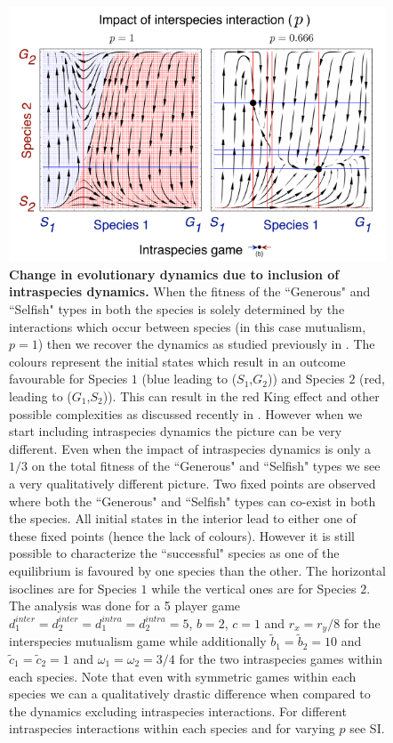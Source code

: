 \documentclass{pnastwo}
\begin{document}
\begin{article}
\begin{figure}[h]
\begin{center}
\includegraphics[width=2\columnwidth]{../Figures/mainexample2.pdf}
\caption{
\textbf{Change in evolutionary dynamics due to inclusion of intraspecies dynamics.} When the fitness of the ``Generous" and ``Selfish" types in both the species is solely determined by the interactions which occur between species (in this case mutualism, $p=1$) then we recover the dynamics as studied previously in \cite{gokhale:PRSB:2012}. The colours represent the initial states which result in an outcome favourable for Species $1$ (blue leading to ($S_1$,$G_2$)) and Species $2$ (red, leading to ($G_1$,$S_2$)). This can result in the red King effect and other possible complexities as discussed recently in \cite{gao:SciRep:2015}. However when we start including intraspecies dynamics the picture can be very different.
Even when the impact of intraspecies dynamics is only a $1/3$ on the total fitness of the ``Generous" and ``Selfish" types we see a very qualitatively different picture.
Two fixed points are observed where both the ``Generous" and ``Selfish" types can co-exist in both the species.
All initial states in the interior lead to either one of these fixed points (hence the lack of colours).
However it is still possible to characterize the ``successful" species as one of the equilibrium is favoured by one species than the other.
The horizontal isoclines are for Species $1$ while the vertical ones are for Species $2$.
The analysis was done for a 5 player game $d_1^{inter} = d_2^{inter} = d_1^{intra} = d_2^{intra} = 5$, $b=2$, $c=1$ and $r_x = r_y /8$ for the interspecies mutualism game while additionally $\tilde{b}_1 = \tilde{b}_2 = 10$ and $\tilde{c}_1 = \tilde{c}_2 = 1$ and $\omega_1 = \omega_2 = 3/4$ for the two intraspecies games within each species. Note that even with symmetric games within each species we can a qualitatively drastic difference when compared to the dynamics excluding intraspecies interactions.  For different intraspecies interactions within each species and for varying $p$ see SI.
}
\end{center}
\end{figure}


\end{article}
\end{document}

